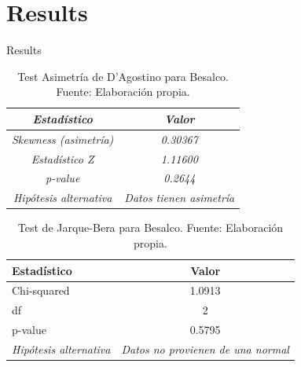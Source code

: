 \documentclass[10pt]{beamer}
\begin{document}
\section{Results}
\begin{frame}{Results}
    \centering
    \begin{table}[ht]
        \centering
        \begin{tabular}{c c}
            \toprule
            \textbf{\textit{Estadístico}} & \textbf{\textit{Valor}} \\ 
            \midrule
            \textit{Skewness (asimetría)} & \textit{0.30367} \\ 
            \textit{Estadístico Z}       & \textit{1.11600} \\ 
            \textit{p-value}             & \textit{0.2644} \\ 
            \textit{Hipótesis alternativa} & \textit{Datos tienen asimetría} \\ 
            \bottomrule
        \end{tabular}
        \caption{Test Asimetría de D'Agostino para Besalco. Fuente: Elaboración propia.}
    \end{table}
    
\begin{table}[ht]
\centering
\begin{tabular}{l c}
\toprule
\textbf{Estadístico} & \textbf{Valor} \\
\midrule
Chi-squared & 1.0913 \\
df       & 2       \\
p-value  & 0.5795 \\
\textit{Hipótesis alternativa} & \textit{Datos no provienen de una normal}\\
\bottomrule
\end{tabular}
\caption{Test de Jarque-Bera para Besalco. Fuente: Elaboración propia.}
\end{table}
\end{frame}
\end{document}
